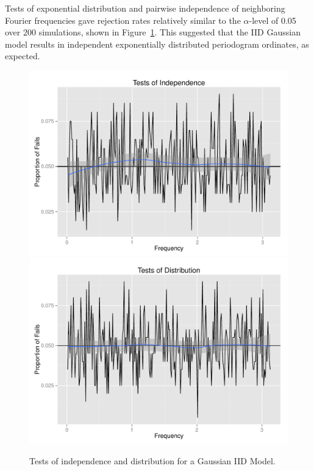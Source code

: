 \documentclass{article}\usepackage{graphicx, color}
\newenvironment{knitrout}{}{} %
\theoremstyle{plain}
\begin{document}
Tests of exponential distribution and pairwise independence of neighboring Fourier frequencies gave rejection rates relatively similar to the $\alpha$-level of 0.05 over 200 simulations, shown in Figure~\ref{fig:tests-iid}. This suggested that the IID Gaussian model results in independent exponentially distributed periodogram ordinates, as expected.

\begin{knitrout}
\color{fgcolor}\begin{figure}[H]

\includegraphics[width=.49\textwidth]{figure/tests-iid1} 
\includegraphics[width=.49\textwidth]{figure/tests-iid2} \caption[Tests of independence and distribution for a Gaussian IID Model]{Tests of independence and distribution for a Gaussian IID Model.\label{fig:tests-iid}}
\end{figure}


\end{knitrout}
\end{document}
